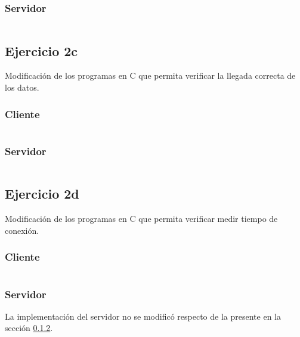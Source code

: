 \documentclass[osajnl,twocolumn,showpacs,superscriptaddress,10pt]{revtex4-1} %
\begin{document}
\subsubsection{Servidor} \label{apendix:2b_server}

\inputminted[mathescape]{c}{../resources/csock/server_2b.c}

\subsection{Ejercicio 2c} \label{apendix:2c}

Modificación de los programas en C que permita verificar la llegada correcta de los datos.

\subsubsection{Cliente} \label{apendix:2c_client}

\inputminted[mathescape]{c}{../resources/csock/client_2c.c}

\subsubsection{Servidor} \label{apendix:2c_server}

\inputminted[mathescape]{c}{../resources/csock/server_2c.c}

\subsection{Ejercicio 2d} \label{apendix:2d}

Modificación de los programas en C que permita verificar medir tiempo de conexión.

\subsubsection{Cliente} \label{apendix:2d_client}

\inputminted[mathescape]{c}{../resources/csock/client_2d.c}

\subsubsection{Servidor} \label{apendix:2d_server}

La implementación del servidor no se modificó respecto de la presente en la sección \ref{apendix:2c_server}.
\end{document}

